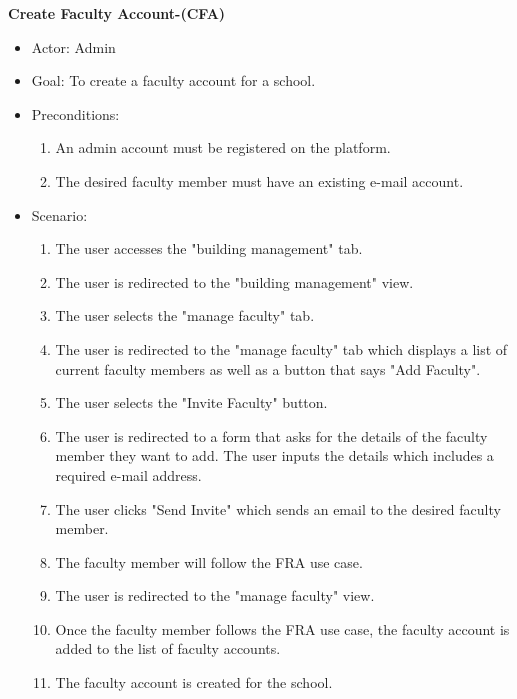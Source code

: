 \documentclass[letterpaper,12pt,oneside,listof=totoc]{scrreprt}
\begin{document}
\hfill \break
\textbf{Create Faculty Account-(CFA)}
\begin{itemize}
    \item Actor: Admin
    \item Goal: To create a faculty account for a school.
    \item Preconditions:
    \begin{enumerate}
        \item An admin account must be registered on the platform.
        \item The desired faculty member must have an existing e-mail account.
    \end{enumerate}
    \item Scenario:
    \begin{enumerate}
        \item The user accesses the "building management" tab. 
        \item The user is redirected to the "building management" view.
        \item The user selects the "manage faculty" tab.
        \item The user is redirected to the "manage faculty" tab which displays a list of current faculty members as well as a button that says "Add Faculty".
        \item The user selects the "Invite Faculty" button.
        \item The user is redirected to a form that asks for the details of the faculty member they want to add. The user inputs the details which includes a required e-mail address.
        \item The user clicks "Send Invite" which sends an email to the desired faculty member.
        \item The faculty member will follow the FRA use case.
        \item The user is redirected to the "manage faculty" view.
        \item Once the faculty member follows the FRA use case, the faculty account is added to the list of faculty accounts.
        \item The faculty account is created for the school.
    \end{enumerate}
\end{itemize}
\end{document}
